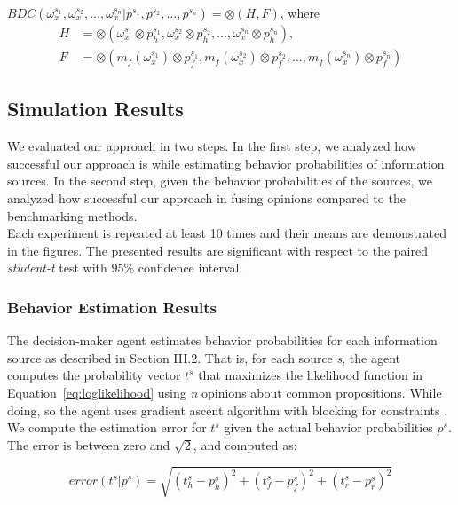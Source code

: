 \documentclass[a4,12pt]{ozu-thesis}
\begin{document}
$BDC(\omega _{x}^{s_{1}}, \omega _{x}^{s_{2}},\ldots, \omega _{x}^{s_{n}}|p^{s_{1}}, p^{s_{2}},\ldots, p^{s_{n}}) = \otimes (H, F)$, where
\begin{align*} 
H &=  \otimes (\omega _{x}^{s_{1}}\otimes p_{h}^{s_{1}}, \omega _{x}^{s_{2}}\otimes p_{h}^{s_{2}},\ldots, \omega _{x}^{s_{n}}\otimes p_{h}^{s_{n}}), \\ 
F &= \otimes (m_{f}(\omega _{x}^{s_{1}})\otimes p_{f}^{s_{1}}, m_{f}(\omega _{x}^{s_{2}})\otimes p_{f}^{s_{2}},\ldots, m_{f}(\omega _{x}^{s_{n}})\otimes p_{f}^{s_{n}})
\end{align*}



\subsection{Simulation Results}
We evaluated our approach in two steps. In the first step, we analyzed how successful our approach is while estimating behavior probabilities of information sources. In the second step, given the behavior probabilities of the sources, we analyzed how successful our approach in fusing opinions compared to the benchmarking methods.
\\Each experiment is repeated at least 10 times and their means are demonstrated in the figures. The presented results are significant with respect to the paired \textit{student-t} test with 95\% confidence interval.

\subsubsection{Behavior Estimation Results}
The decision-maker agent estimates behavior probabilities for each information source as described in Section III.2. That is, for each source \textit{s}, the agent computes the probability vector $t^{s}$ that maximizes the likelihood function in Equation~\ref{eq:loglikelihood} using \textit{n} opinions about common propositions. While doing, so the agent uses gradient ascent algorithm with blocking for constraints \cite{boyd2004convex}. We compute the estimation error for $t^{s}$ given the actual behavior probabilities $p^{s}$. The error is between zero and $\sqrt{2}$, and computed as:

\begin{equation}
error\left ( t^{s} | p^{s}\right ) = \sqrt{\left ( t_{h}^{s} - p_{h}^{s}\right )^{2} + \left ( t_{f}^{s} - p_{f}^{s}\right )^{2} + \left ( t_{r}^{s} - p_{r}^{s}\right )^{2}}
\end{equation}
\end{document}
